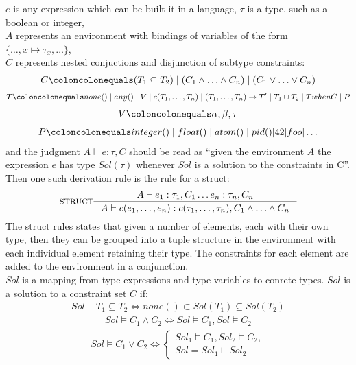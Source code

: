 \documentclass[12pt, titlepage]{article}
\begin{document}
$e$ is any expression which can be built it in a language,
$\tau$ is a type, such as a boolean or integer, \\
$A$ represents an environment with bindings of variables of the form $\{\ldots, x \mapsto \tau_x, \ldots\}$, \\
$C$ represents nested conjuctions and disjunction of subtype constraints:
\begin{align*} 
	C \coloncolonequals (T_1 \subseteq T_2) \mid (C_1 \land \ldots \land C_n) \mid (C_1 \lor \ldots \lor C_n)
\end{align*}
\begin{align*} 
	T \coloncolonequals none() \mid any() \mid V \mid c(T_1, \ldots, T_n) \mid (T_1, \ldots, T_n) \rightarrow T'\mid T_1 \cup T_2 \mid T when C \mid P
\end{align*}
\begin{align*} 
	V \coloncolonequals \alpha, \beta, \tau
\end{align*}
\begin{align*} 
	P \coloncolonequals integer() \mid float() \mid atom() \mid pid()| 42 | foo | \ldots
\end{align*}
and the judgment $A \vdash e : \tau, C$ should be read as ``given the environment $A$ the expression $e$ has type $Sol(\tau)$ whenever $Sol$ is a solution to the constraints in C''. \\
Then one such derivation rule is the rule for a struct:
                \[
\inference*[STRUCT]{  A \vdash  e_1 : \tau_1, C_1 \ldots e_n : \tau_n, C_n}
                                        {A \vdash  c(e_1, \ldots, e_n) : c(\tau_1, \ldots, \tau_n), C_1 \land \ldots \land C_n}
                \]
The struct rules states that given a number of elements, each with their own type, then they can be grouped into a tuple structure in the environment with each individual element retaining their type. The constraints for each element are added to the environment in a conjunction. \\
$Sol$ is a mapping from type expressions and type variables to conrete types. $Sol$ is a solution to a constraint set $C$ if:
\begin{align*} 
	Sol \models T_1 \subseteq T_2 \iff none() \subset Sol(T_1) \subseteq Sol(T_2)
\end{align*}
\begin{align*} 
	Sol \models C_1 \land C_2 \iff Sol \models C_1, Sol \models  C_2
\end{align*}
\begin{align*} 
	Sol \models C_1 \lor C_2 \iff \begin{cases} Sol_1 \models C_1, Sol_2 \models C_2, \\
	                                            Sol = Sol_1 \sqcup Sol_2 \end{cases}
\end{align*}
\end{document}

